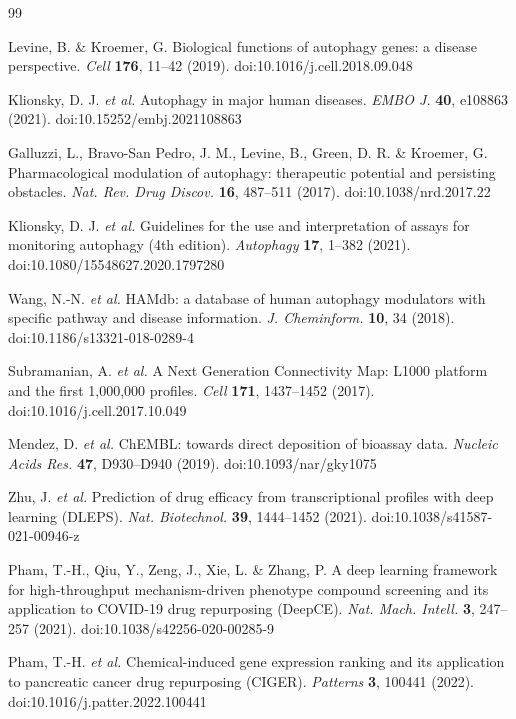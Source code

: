 \documentclass[11pt]{article}
\begin{document}
\begin{thebibliography}{99}

Levine, B. \& Kroemer, G. Biological functions of autophagy genes: a disease
perspective. \textit{Cell} \textbf{176}, 11--42 (2019).
doi:10.1016/j.cell.2018.09.048

Klionsky, D. J. \textit{et al.} Autophagy in major human diseases.
\textit{EMBO J.} \textbf{40}, e108863 (2021).
doi:10.15252/embj.2021108863

Galluzzi, L., Bravo-San Pedro, J. M., Levine, B., Green, D. R. \& Kroemer, G.
Pharmacological modulation of autophagy: therapeutic potential and persisting
obstacles. \textit{Nat. Rev. Drug Discov.} \textbf{16}, 487--511 (2017).
doi:10.1038/nrd.2017.22

Klionsky, D. J. \textit{et al.} Guidelines for the use and interpretation of
assays for monitoring autophagy (4th edition). \textit{Autophagy} \textbf{17},
1--382 (2021). doi:10.1080/15548627.2020.1797280

Wang, N.-N. \textit{et al.} HAMdb: a database of human autophagy modulators
with specific pathway and disease information. \textit{J. Cheminform.}
\textbf{10}, 34 (2018). doi:10.1186/s13321-018-0289-4

Subramanian, A. \textit{et al.} A Next Generation Connectivity Map: L1000
platform and the first 1{,}000{,}000 profiles. \textit{Cell} \textbf{171},
1437--1452 (2017). doi:10.1016/j.cell.2017.10.049

Mendez, D. \textit{et al.} ChEMBL: towards direct deposition of bioassay
data. \textit{Nucleic Acids Res.} \textbf{47}, D930--D940 (2019).
doi:10.1093/nar/gky1075

Zhu, J. \textit{et al.} Prediction of drug efficacy from transcriptional
profiles with deep learning (DLEPS). \textit{Nat. Biotechnol.} \textbf{39},
1444--1452 (2021). doi:10.1038/s41587-021-00946-z

Pham, T.-H., Qiu, Y., Zeng, J., Xie, L. \& Zhang, P. A deep learning framework
for high-throughput mechanism-driven phenotype compound screening and its
application to COVID-19 drug repurposing (DeepCE). \textit{Nat. Mach. Intell.}
\textbf{3}, 247--257 (2021). doi:10.1038/s42256-020-00285-9

Pham, T.-H. \textit{et al.} Chemical-induced gene expression ranking and its
application to pancreatic cancer drug repurposing (CIGER). \textit{Patterns}
\textbf{3}, 100441 (2022). doi:10.1016/j.patter.2022.100441


\end{thebibliography}
\end{document}
